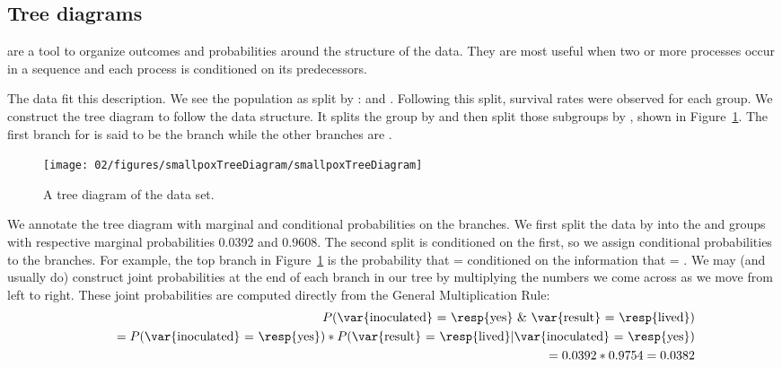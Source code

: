 \subsection{Tree diagrams}

 are a tool to organize outcomes and probabilities around the structure of the data. They are most useful when two or more processes occur in a sequence and each process is conditioned on its predecessors.

The  data fit this description. We see the population as split by :  and . Following this split, survival rates were observed for each group. We construct the tree diagram to follow the data structure. It splits the group by  and then split those subgroups by , shown in Figure~\ref{smallpoxTreeDiagram}. The first branch for  is said to be the  branch while the other branches are .
\begin{figure}[ht]
\centering
\texttt{[image: 02/figures/smallpoxTreeDiagram/smallpoxTreeDiagram]}
\caption{A tree diagram of the  data set.}
\label{smallpoxTreeDiagram}
\end{figure}

We annotate the tree diagram with marginal and conditional probabilities on the branches. We first split the data by  into the  and  groups with respective marginal probabilities 0.0392 and 0.9608. The second split is conditioned on the first, so we assign conditional probabilities to the branches. For example, the top branch in Figure~\ref{smallpoxTreeDiagram} is the probability that  =  conditioned on the information that  = . We may (and usually do) construct joint probabilities at the end of each branch in our tree by multiplying the numbers we come across as we move from left to right. These joint probabilities are computed directly from the General Multiplication Rule:
\begin{eqnarray*}
&& P(\text{\var{inoculated} = \resp{yes} \& \var{result} = \resp{lived}}) \\
	&&\quad = P(\text{\var{inoculated} = \resp{yes}})*P(\text{\var{result} = \resp{lived}}|\text{\var{inoculated} = \resp{yes}}) \\
	&&\quad = 0.0392*0.9754=0.0382
\end{eqnarray*}

